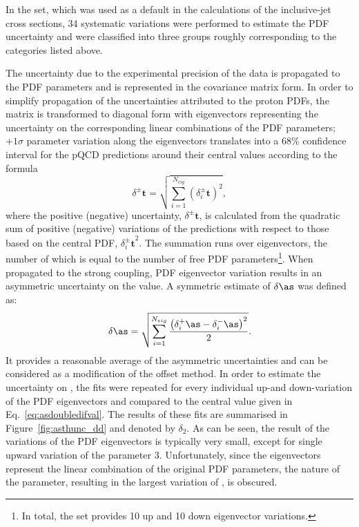In the  set, which was used as a default in the calculations of the inclusive-jet cross sections, 34 systematic variations were performed to estimate the PDF uncertainty and were classified into three groups roughly corresponding to the categories listed above. 

The uncertainty due to the experimental precision of the data is propagated to the PDF parameters and is represented in the covariance matrix form. In order to simplify propagation of the uncertainties attributed to the proton PDFs, the matrix is transformed to diagonal form with eigenvectors representing the uncertainty on the corresponding linear combinations of the PDF parameters; $+1\sigma$ parameter variation along the eigenvectors translates into a 68\% confidence interval for the pQCD predictions around their central values according to the formula~\cite{Campbell:2006wx}
\begin{equation}
 \delta^{\pm}\mathbf{t} = \sqrt{\sum_{i=1}^{N_{eig}}{\left(\mbox{$\delta_i^{\pm}\mathbf{t}$}\right)^2}},
 \label{eq:mastereq}
\end{equation}
where the positive (negative) uncertainty, $\delta^{\pm}\mathbf{t}$, is calculated from the quadratic sum of positive (negative) variations of the predictions with respect to those based on the central PDF, $\mbox{$\delta_i^{\pm}\mathbf{t}$}^2$. The summation runs over eigenvectors, the number of which is equal to the number of free PDF parameters\footnote{In total, the  set provides 10 up and 10 down eigenvector variations.}. When propagated to the strong coupling, PDF eigenvector variation results in an asymmetric uncertainty on the \as value. A symmetric estimate of $\delta\as$ was defined as:
\begin{equation}
 \delta\as = \sqrt{\sum_{i=1}^{N_{eig}}{\frac{\left(\mbox{$\delta_i^{+}\as$} - \mbox{$\delta_i^{-}\as$}\right)^2}{2}}}.
 \label{eq:mastereqsym}
\end{equation}
It provides a reasonable average of the asymmetric uncertainties and can be considered as a modification of the offset method. In order to estimate the uncertainty on \asz, the \as fits were repeated for every individual up-and down-variation of the PDF eigenvectors and compared to the central value given in Eq.~\ref{eq:asdoubledifval}. The results of these fits are summarised in Figure~\ref{fig:asthunc_dd} and denoted by $\delta_2$. As can be seen, the result of the variations of the PDF eigenvectors is typically very small, except for single upward variation of the parameter $3$. Unfortunately, since the eigenvectors represent the linear combination of the original PDF parameters, the nature of the parameter, resulting in the largest variation of \asz, is obscured.
